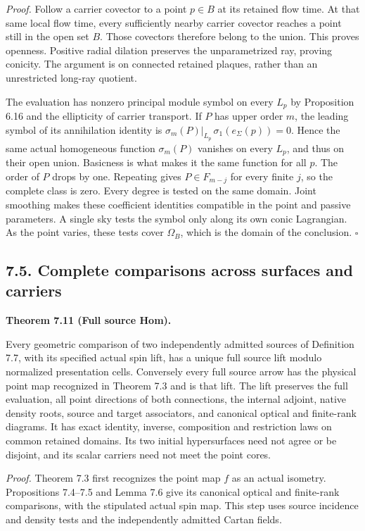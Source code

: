 \documentclass[
  english,
  11pt,
  reqno]{amsart}
\makeatletter
\newcommand{\paperdisplaynext}{%
  \let\paper@savedstartsection\@startsection
  \def\@startsection##1##2##3##4##5##6{%
    \let\@startsection\paper@savedstartsection
    \@tempskipa ##5\relax
    \ifdim\@tempskipa<\z@
      \def\paper@afterskip{.35\baselineskip}%
    \else
      \def\paper@afterskip{##5}%
    \fi
    \@startsection{##1}{##2}{##3}{##4}{\paper@afterskip}{##6}}}
\newcommand{\paperdisplaysection}{\paperdisplaynext\subsection}
\newcommand{\pandocstatementheading}[1]{%
  \par\if@nobreak\else
    \addpenalty{\@beginparpenalty}%
    \addvspace{.5\baselineskip plus .2\baselineskip minus .2\baselineskip}%
  \fi
  {\normalfont\bfseries #1\par}%
  \nobreak\@afterindenttrue\@afterheading
}
\let\paper@displaysection\paperdisplaysection
\renewcommand{\paperdisplaysection}[1]{%
  \let\paper@savedhangfrom\@hangfrom
  \long\def\@hangfrom##1##2{%
    \paper@savedhangfrom{##1}{\paper@headingparagraph##2}}%
  \paper@displaysection{#1}%
  \let\@hangfrom\paper@savedhangfrom}
\makeatother
\begin{document}
\emph{Proof.} Follow a carrier covector to a point \(p\in B\) at its
retained flow time. At that same local flow time, every sufficiently
nearby carrier covector reaches a point still in the open set \(B\).
Those covectors therefore belong to the union. This proves openness.
Positive radial dilation preserves the unparametrized ray, proving
conicity. The argument is on connected retained plaques, rather than an
unrestricted long-ray quotient.

The evaluation has nonzero principal module symbol on every \(L_p\) by
Proposition 6.16 and the ellipticity of carrier transport. If \(P\) has
upper order \(m\), the leading symbol of its annihilation identity is
\(\sigma_m(P)|_{L_p}\,\sigma_1(e_\Sigma(p))=0\). Hence the same actual
homogeneous function \(\sigma_m(P)\) vanishes on every \(L_p\), and thus
on their open union. Basicness is what makes it the same function for
all \(p\). The order of \(P\) drops by one. Repeating gives
\(P\in F_{m-j}\) for every finite \(j\), so the complete class is zero.
Every degree is tested on the same domain. Joint smoothing makes these
coefficient identities compatible in the point and passive parameters. A
single sky tests the symbol only along its own conic Lagrangian. As the
point varies, these tests cover \(\Omega_B\), which is the domain of the
conclusion. \hfill\(\square\)

\paperdisplaysection{7.5. Complete comparisons across surfaces and
carriers}\label{complete-comparisons-across-surfaces-and-carriers}\label{sec:online-full-unmarked-hom}

\pandocstatementheading{\leavevmode{}\label{thm:online-full-unmarked-source-hom}Theorem 7.11 (Full source Hom).}

Every geometric comparison of two independently admitted sources of
Definition 7.7, with its specified actual spin lift, has a unique full
source lift modulo normalized presentation cells. Conversely every full
source arrow has the physical point map recognized in Theorem 7.3 and is
that lift. The lift preserves the full evaluation, all point directions
of both connections, the internal adjoint, native density roots, source
and target associators, and canonical optical and finite-rank diagrams.
It has exact identity, inverse, composition and restriction laws on
common retained domains. Its two initial hypersurfaces need not agree or
be disjoint, and its scalar carriers need not meet the point cores.

\emph{Proof.} Theorem 7.3 first recognizes the point map \(f\) as an
actual isometry. Propositions 7.4--7.5 and Lemma 7.6 give its canonical
optical and finite-rank comparisons, with the stipulated actual spin
map. This step uses source incidence and density tests and the
independently admitted Cartan fields.
\end{document}
